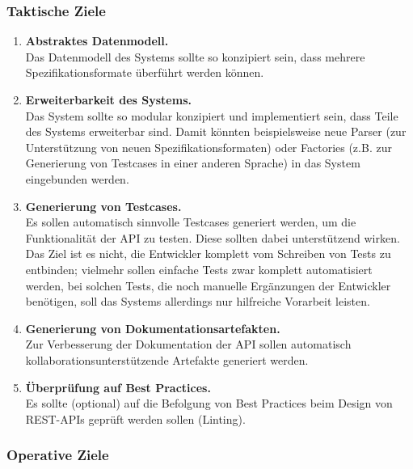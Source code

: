 
\subsubsection{Taktische Ziele}

\begin{enumerate}
	\item \textbf{Abstraktes Datenmodell.} \\
	Das Datenmodell des Systems sollte so konzipiert sein, dass mehrere Spezifikationsformate überführt werden können.
	\item \textbf{Erweiterbarkeit des Systems.} \\
	Das System sollte so modular konzipiert und implementiert sein, dass Teile des Systems erweiterbar sind. Damit könnten beispielsweise neue Parser (zur Unterstützung von neuen Spezifikationsformaten) oder Factories (z.B. zur Generierung von Testcases in einer anderen Sprache) in das System eingebunden werden.
	\item \textbf{Generierung von Testcases.} \\
	Es sollen automatisch sinnvolle Testcases generiert werden, um die Funktionalität der API zu testen. Diese sollten dabei unterstützend wirken. Das Ziel ist es nicht, die Entwickler komplett vom Schreiben von Tests zu entbinden; vielmehr sollen einfache Tests zwar komplett automatisiert werden, bei solchen Tests, die noch manuelle Ergänzungen der Entwickler benötigen, soll das Systems allerdings nur hilfreiche Vorarbeit leisten.  
	\item \textbf{Generierung von Dokumentationsartefakten.} \\
	Zur Verbesserung der Dokumentation der API sollen automatisch kollaborationsunterstützende Artefakte generiert werden.
	\item \textbf{Überprüfung auf Best Practices.}  \\
	Es sollte (optional) auf die Befolgung von Best Practices beim Design von REST-APIs geprüft werden sollen (Linting). 
	
\end{enumerate}


\subsubsection{Operative Ziele}

